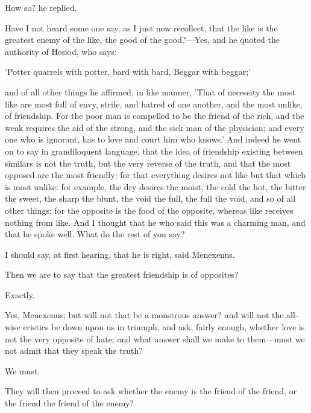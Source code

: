 \documentclass[11pt,letter]{article}
\begin{document}
\par  How so? he replied.

\par  Have I not heard some one say, as I just now recollect, that the like is the greatest enemy of the like, the good of the good?—Yes, and he quoted the authority of Hesiod, who says:

\par  'Potter quarrels with potter, bard with bard, Beggar with beggar;'

\par  and of all other things he affirmed, in like manner, 'That of necessity the most like are most full of envy, strife, and hatred of one another, and the most unlike, of friendship. For the poor man is compelled to be the friend of the rich, and the weak requires the aid of the strong, and the sick man of the physician; and every one who is ignorant, has to love and court him who knows.' And indeed he went on to say in grandiloquent language, that the idea of friendship existing between similars is not the truth, but the very reverse of the truth, and that the most opposed are the most friendly; for that everything desires not like but that which is most unlike: for example, the dry desires the moist, the cold the hot, the bitter the sweet, the sharp the blunt, the void the full, the full the void, and so of all other things; for the opposite is the food of the opposite, whereas like receives nothing from like. And I thought that he who said this was a charming man, and that he spoke well. What do the rest of you say?

\par  I should say, at first hearing, that he is right, said Menexenus.

\par  Then we are to say that the greatest friendship is of opposites?

\par  Exactly.

\par  Yes, Menexenus; but will not that be a monstrous answer? and will not the all-wise eristics be down upon us in triumph, and ask, fairly enough, whether love is not the very opposite of hate; and what answer shall we make to them—must we not admit that they speak the truth?

\par  We must.

\par  They will then proceed to ask whether the enemy is the friend of the friend, or the friend the friend of the enemy?
\end{document}
